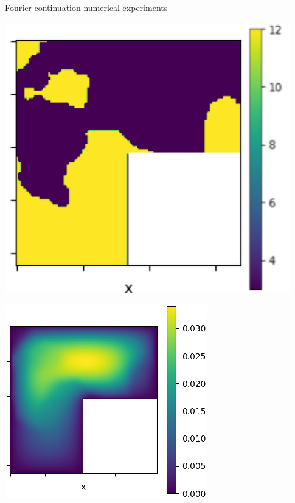 \documentclass{beamer}
\begin{document}
\begin{frame}{Fourier continuation numerical experiments}
	\begin{center}
		\begin{minipage}{0.24\textwidth}
			\includegraphics[width=0.93\textwidth]{FNO_continuation_input.png}
		\end{minipage}
		\hfill
		\begin{minipage}{0.24\textwidth}
			\includegraphics[width=\textwidth]{FNO_continuation_output.png}

\end{minipage}
\end{center}
\end{frame}
\end{document}

